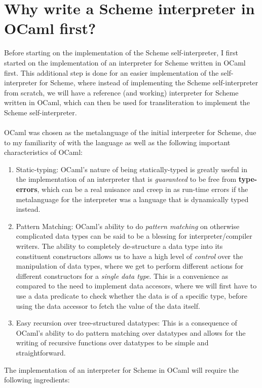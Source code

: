 \section{Why write a Scheme interpreter in OCaml first?}
Before starting on the implementation of the Scheme self-interpreter, I first started on the implementation of an interpreter for Scheme written in OCaml first. 
This additional step is done for an easier implementation of the self-interpreter for Scheme, where instead of implementing the Scheme self-interpreter from scratch, we will have a reference (and working) interpreter for Scheme 
written in OCaml, which can then be used for transliteration to implement the Scheme self-interpreter.
\\
\\
OCaml was chosen as the metalanguage of the initial interpreter for Scheme, due to my familiarity of with the language as well as the following important characteristics of OCaml:
\begin{enumerate}
   \item Static-typing: OCaml’s nature of being statically-typed is greatly useful in the implementation of an interpreter that is \textit{guaranteed} to be free from \textbf{type-errors}, which can be a real nuisance and creep in 
   as run-time errors if the metalanguage for the interpreter was a language that is dynamically typed instead. 
   \item Pattern Matching: OCaml’s ability to do \textit{pattern matching} on otherwise complicated data types can be said to be a blessing for interpreter/compiler writers. The ability to completely de-structure a data type into its constituent constructors allows us to have a 
   high level of \textit{control} over the manipulation of data types, where we get to perform different actions for different constructors for a \textit{single data type}. This is a convenience as compared to the need to implement
   data accesors, where we will first have to use a data predicate to check whether the data is of a specific type, before using the data accessor to fetch the value of the data itself.
   \item Easy recursion over tree-structured datatypes: This is a consequence of OCaml’s ability to do pattern matching over datatypes and allows for the writing of recursive functions over datatypes to be simple and 
   straightforward.
\end{enumerate}
The implementation of an interpreter for Scheme in OCaml will require the following ingredients:
